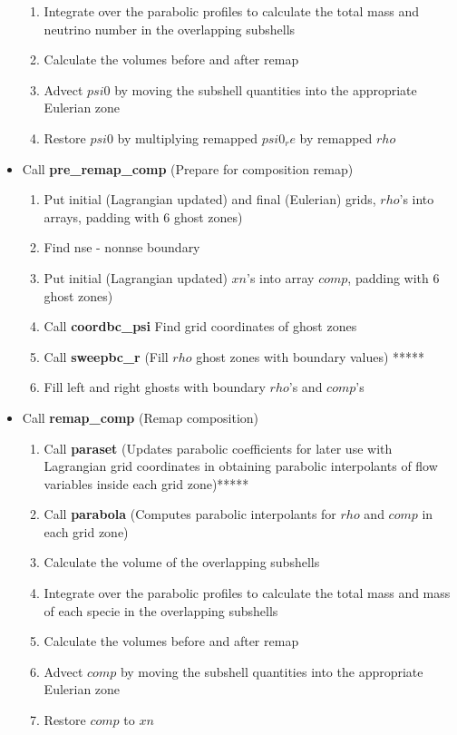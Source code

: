 \documentclass[11pt,doublespace]{article}
\begin{document}
\begin{itemize}
\begin{enumerate}
  \item Integrate over the parabolic profiles to calculate the total mass and neutrino number in the overlapping subshells
  \item Calculate the volumes before and after remap
  \item Advect $psi0$ by moving the subshell quantities into the appropriate Eulerian zone
  \item Restore $psi0$ by multiplying remapped $psi0_re$ by remapped $rho$
\end{enumerate}
  \item Call {\bf pre\_remap\_comp} (Prepare for composition remap)
 \begin{enumerate}
  \item Put initial (Lagrangian updated) and final (Eulerian) grids, $rho$'s into arrays, padding with 6 ghost zones)
 \item Find nse - nonnse boundary
  \item Put initial (Lagrangian updated) $xn$'s into array $comp$, padding with 6 ghost zones)
 \item Call {\bf coordbc\_psi} Find grid coordinates of ghost zones
 \item Call {\bf sweepbc\_r} (Fill $rho$ ghost zones with boundary values) *****
 \item Fill left and right ghosts with boundary $rho$'s and $comp$'s
\end{enumerate}
  \item Call {\bf remap\_comp} (Remap composition)
\begin{enumerate}
  \item Call {\bf paraset} (Updates parabolic coefficients for later use with Lagrangian grid coordinates  in obtaining parabolic interpolants of flow variables inside each grid zone)*****
  \item Call {\bf parabola} (Computes parabolic interpolants for $rho$ and $comp$ in each grid zone)
  \item Calculate the volume of the overlapping subshells
  \item Integrate over the parabolic profiles to calculate the total mass and mass of each specie in the overlapping subshells
  \item Calculate the volumes before and after remap
  \item Advect $comp$ by moving the subshell quantities into the appropriate Eulerian zone
  \item Restore $comp$ to $xn$
\end{enumerate}

\end{itemize}
\end{document}

